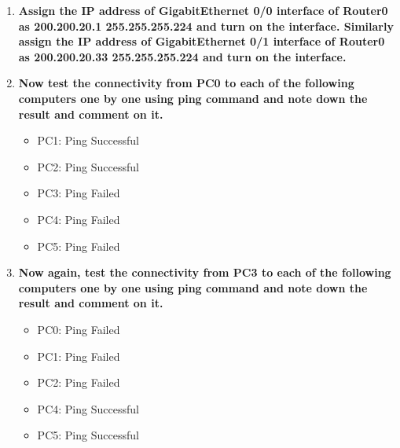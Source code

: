 \documentclass[a4paper,11pt]{article}
\begin{document}
\begin{enumerate}
      \item \textbf{Assign the IP address of GigabitEthernet 0/0 interface of Router0 as 200.200.20.1 255.255.255.224 and turn on the interface. Similarly assign the IP address of GigabitEthernet 0/1 interface of Router0 as 200.200.20.33 255.255.255.224 and turn on the interface.}




      \item \textbf{Now test the connectivity from PC0 to each of the following computers one by one using ping command and note down the result and comment on it.}
            \begin{itemize}
                  \item PC1: Ping Successful
                  \item PC2: Ping Successful\\
                  \item PC3: Ping Failed
                  \item PC4: Ping Failed
                  \item PC5: Ping Failed
            \end{itemize}
      \item \textbf{Now again, test the connectivity from PC3 to each of the following computers one by one using ping command and note down the result and comment on it.}
            \begin{itemize}
                  \item PC0: Ping Failed
                  \item PC1: Ping Failed
                  \item PC2: Ping Failed\\
                  \item PC4: Ping Successful
                  \item PC5: Ping Successful
            \end{itemize}


\end{enumerate}
\end{document}
